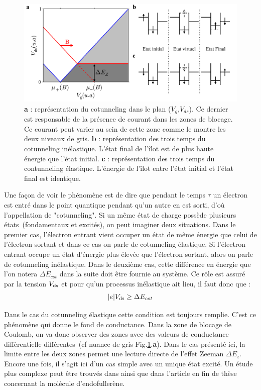 \begin{figure}
\includegraphics[scale=0.45]{Annexe2/figure5/figure5.pdf} 
\caption{\textbf{a} : représentation du cotunneling dans le plan ($V_g$,$V_{ds}$). Ce dernier est responsable de la présence de courant dans les zones de blocage. Ce courant peut varier au sein de cette zone comme le montre les deux niveaux de gris. \textbf{b} : représentation des trois temps du cotunneling inélastique. L'état final de l'\^ilot est de plus haute énergie que l'état initial. \textbf{c} : représentation des trois temps du contunneling élastique. L'énergie de l'\^ilot entre l'état initial et l'état final est identique.}
\label{cotun}
\end{figure}


Une façon de voir le phénomène est de dire que pendant le temps $\tau$ un électron est entré dans le point quantique pendant qu'un autre en est sorti, d'où l'appellation de "cotunneling". Si un m\^eme état de charge possède plusieurs états~(fondamentaux et excités), on peut imaginer deux situations. Dans le premier cas, l'électron entrant vient occuper un état de m\^eme énergie que celui de l'électron sortant et dans ce cas on parle de cotunneling élastique. Si l'électron entrant occupe un état d'énergie plus élevée que l'électron sortant, alors on parle de cotunneling inélastique. Dans le deuxième cas, cette différence en énergie que l'on notera $\Delta E_{cot}$ dans la suite doit être fournie au système. Ce rôle est assuré par la tension $V_{\rm{ds}}$ et pour qu'un processus inélastique ait lieu, il faut donc que :
\begin{eqnarray}
|e|V_{\rm{ds}} \geq \Delta E_{cot}
\end{eqnarray}

Dans le cas du cotunneling élastique cette condition est toujours remplie. C'est ce phénomène qui donne le fond de conductance. Dans la zone de blocage de Coulomb, on va donc observer des zones avec des valeurs de conductance différentielle différentes~(cf nuance de gris Fig.\ref{cotun}.\textbf{a}). Dans le cas présenté ici, la limite entre les deux zones permet une lecture directe de l'effet Zeeman $\Delta E_z$. Encore une fois, il s'agit ici d'un cas simple avec un unique état excité. Un étude plus complexe peut \^etre trouvés dans \cite{DeFranceschi2001} ainsi que dans l'article en fin de thèse concernant la molécule d'endofullerène.\newline

